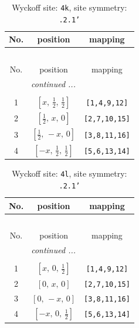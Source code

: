 \documentclass[fleqn,8pt]{jsarticle}
\begin{document}
\renewcommand{\arraystretch}{1.2}
\begin{longtable}{ccc}
\caption{Wyckoff site: {\tt 4k}, site symmetry: {\tt .2.1'}}
 \\
 \hline \hline
No. & position & mapping \\ \hline \endfirsthead

\multicolumn{2}{l}{\tablename\ \thetable{}} \\
 \hline \hline
No. & position & mapping \\ \hline \endhead

 \hline \hline
\multicolumn{2}{r}{\footnotesize\it continued ...} \\ \endfoot

 \hline \hline
\multicolumn{2}{r}{} \\ \endlastfoot

1 & $\left[ x,\, \frac{1}{2},\, \frac{1}{2} \right]$ & {\tt [1,4,9,12]} \\ \hline
2 & $\left[ \frac{1}{2},\, x,\, 0 \right]$ & {\tt [2,7,10,15]} \\ \hline
3 & $\left[ \frac{1}{2},\, - x,\, 0 \right]$ & {\tt [3,8,11,16]} \\ \hline
4 & $\left[ - x,\, \frac{1}{2},\, \frac{1}{2} \right]$ & {\tt [5,6,13,14]} \\
\end{longtable}
\renewcommand{\arraystretch}{1.2}
\begin{longtable}{ccc}
\caption{Wyckoff site: {\tt 4l}, site symmetry: {\tt .2.1'}}
 \\
 \hline \hline
No. & position & mapping \\ \hline \endfirsthead

\multicolumn{2}{l}{\tablename\ \thetable{}} \\
 \hline \hline
No. & position & mapping \\ \hline \endhead

 \hline \hline
\multicolumn{2}{r}{\footnotesize\it continued ...} \\ \endfoot

 \hline \hline
\multicolumn{2}{r}{} \\ \endlastfoot

1 & $\left[ x,\, 0,\, \frac{1}{2} \right]$ & {\tt [1,4,9,12]} \\ \hline
2 & $\left[ 0,\, x,\, 0 \right]$ & {\tt [2,7,10,15]} \\ \hline
3 & $\left[ 0,\, - x,\, 0 \right]$ & {\tt [3,8,11,16]} \\ \hline
4 & $\left[ - x,\, 0,\, \frac{1}{2} \right]$ & {\tt [5,6,13,14]} \\
\end{longtable}
\end{document}

